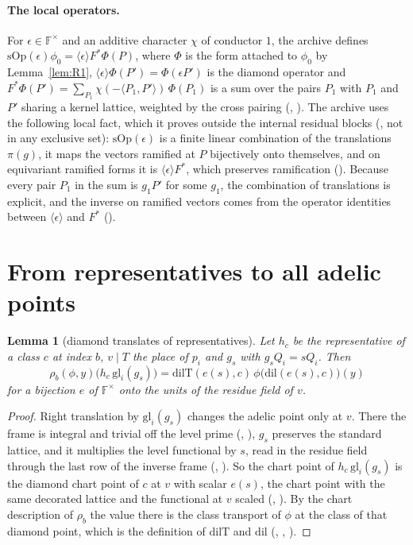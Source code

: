 \documentclass[11pt]{article}
\newcommand{\Fq}{\mathbb F}
\newcommand{\rT}{\rho}
\newtheorem{lemma}[theorem]{Lemma}
\theoremstyle{definition}
\theoremstyle{remark}
\begin{document}
\paragraph{The local operators.} For $\epsilon\in\Fq^\times$ and an additive character $\chi$ of conductor $1$, the archive defines $\mathrm{sOp}(\epsilon)\phi_0=\langle\epsilon\rangle F^{*}\Phi(P)$, where $\Phi$ is the form attached to $\phi_0$ by Lemma~\ref{lem:R1}, $\langle\epsilon\rangle\Phi(P')=\Phi(\epsilon P')$ is the diamond operator and $F^{*}\Phi(P')=\sum_{P_1}\chi(-\langle P_1,P'\rangle)\,\Phi(P_1)$ is a sum over the pairs $P_1$ with $P_1$ and $P'$ sharing a kernel lattice, weighted by the cross pairing (, ). The archive uses the following local fact, which it proves outside the internal residual blocks (, not in any exclusive set): $\mathrm{sOp}(\epsilon)$ is a finite linear combination of the translations $\pi(g)$, it maps the vectors ramified at $P$ bijectively onto themselves, and on equivariant ramified forms it is $\langle\epsilon\rangle F^{*}$, which preserves ramification (). Because every pair $P_1$ in the sum is $g_1P'$ for some $g_1$, the combination of translations is explicit, and the inverse on ramified vectors comes from the operator identities between $\langle\epsilon\rangle$ and $F^{*}$ ().

\section{From representatives to all adelic points}

\begin{lemma}[diamond translates of representatives]\label{lem:R2}
Let $h_c$ be the representative of a class $c$ at index $b$, $v\mid T$ the place of $p_i$ and $g_s$ with $g_sQ_i=sQ_i$. Then
\[
\rT_b(\phi,y)\big(h_c\,\mathrm{gl}_i(g_s)\big)=\mathrm{dilT}(e(s),c)\,\phi\big(\mathrm{dil}(e(s),c)\big)(y)
\]
for a bijection $e$ of $\Fq^\times$ onto the units of the residue field of $v$.
\end{lemma}

\begin{proof}
Right translation by $\mathrm{gl}_i(g_s)$ changes the adelic point only at $v$. There the frame is integral and trivial off the level prime (, ), $g_s$ preserves the standard lattice, and it multiplies the level functional by $s$, read in the residue field through the last row of the inverse frame (, ). So the chart point of $h_c\,\mathrm{gl}_i(g_s)$ is the diamond chart point of $c$ at $v$ with scalar $e(s)$, the chart point with the same decorated lattice and the functional at $v$ scaled (, ). By the chart description of $\rT_b$ the value there is the class transport of $\phi$ at the class of that diamond point, which is the definition of $\mathrm{dilT}$ and $\mathrm{dil}$ (, , ).
\end{proof}
\end{document}
